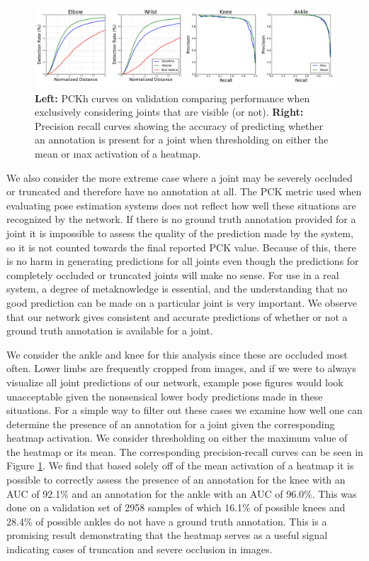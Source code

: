 \documentclass[runningheads]{llncs}
\begin{document}
\begin{figure}[t]
\centering
\includegraphics[width=\textwidth]{img/occlusion}
\caption{\textbf{Left:} PCKh curves on validation comparing
  performance when exclusively considering joints that are visible (or
  not). \textbf{Right:} Precision recall curves showing the accuracy
  of predicting whether an annotation is present for a joint when
  thresholding on either the mean or max activation of a heatmap.}
\label{fig:occlusion}
\end{figure}

We also consider the more extreme case where a joint may be severely
occluded or truncated and therefore have no annotation at all. The PCK
metric used when evaluating pose estimation systems does not reflect
how well these situations are recognized by the network. If there is
no ground truth annotation provided for a joint it is impossible to
assess the quality of the prediction made by the system, so it is not
counted towards the final reported PCK value. Because of this, there
is no harm in generating predictions for all joints even though the
predictions for completely occluded or truncated joints will make no
sense. For use in a real system, a degree of metaknowledge is
essential, and the understanding that no good prediction can be made
on a particular joint is very important. We observe that our network
gives consistent and accurate predictions of whether or not a ground
truth annotation is available for a joint.

We consider the ankle and knee for this analysis since these are
occluded most often. Lower limbs are frequently cropped from images,
and if we were to always visualize all joint predictions of our
network, example pose figures would look unacceptable given the
nonsensical lower body predictions made in these situations. For a
simple way to filter out these cases we examine how well one can
determine the presence of an annotation for a joint given the
corresponding heatmap activation. We consider thresholding on either
the maximum value of the heatmap or its mean. The corresponding
precision-recall curves can be seen in Figure \ref{fig:occlusion}. We
find that based solely off of the mean activation of a heatmap it is
possible to correctly assess the presence of an annotation for the
knee with an AUC of 92.1\% and an annotation for the ankle with
an AUC of 96.0\%. This was done on a validation set of 2958
samples of which 16.1\% of possible knees and 28.4\% of possible
ankles do not have a ground truth annotation. This is a promising
result demonstrating that the heatmap serves as a useful signal
indicating cases of truncation and severe occlusion in images.
\end{document}
